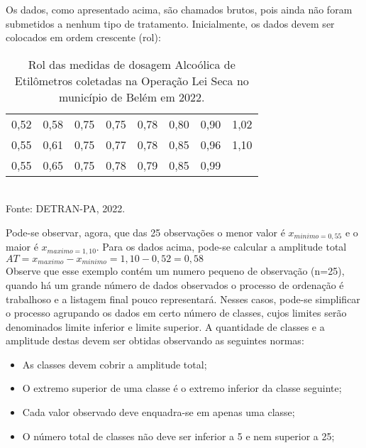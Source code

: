 Os dados, como apresentado acima, são chamados brutos, pois ainda não foram submetidos a nenhum tipo de tratamento. Inicialmente, os dados devem ser colocados em ordem crescente (rol):


\begin{table}[!htb]
    \centering
    {
    \caption{Rol das medidas de dosagem Alcoólica de Etilômetros coletadas na Operação Lei Seca no município de Belém em 2022.}
    \label{estatura}
    \vspace{0.2cm}
\begin{tabular}{c|c|c|c|c|c|c|c}
  \hline\hline
  0,52 & 0,58 & 0,75 & 0,75 & 0,78 & 0,80 & 0,90 & 1,02 \\
  0,55 & 0,61 & 0,75 & 0,77 & 0,78 & 0,85 & 0,96 & 1,10  \\
  0,55 & 0,65 & 0,75 & 0,78 & 0,79 & 0,85 & 0,99 &     \\
  \hline\hline
\end{tabular}}
\\
\hspace{-4.5cm}
Fonte: DETRAN-PA, 2022.
\end{table}


\newpage 
Pode-se observar, agora, que das 25 observações o menor valor é $x_{minimo = 0,55}$ e o maior é $x_{maximo= 1,10}$. Para os dados acima, pode-se calcular a amplitude total $AT = x_{maximo}-x_{minimo}=1,10-0,52=0,58$
\\



Observe que esse exemplo contém um numero pequeno de observação (n=25), quando há um grande número de dados observados o processo de ordenação é trabalhoso e a listagem final pouco representará. Nesses casos, pode-se simplificar o processo agrupando os dados em certo número de classes, cujos limites serão denominados limite inferior e limite superior. A quantidade de classes e a amplitude destas devem ser obtidas observando as seguintes normas:



\begin{itemize}
  \item As classes devem cobrir a amplitude total;
  \item O extremo superior de uma classe é o extremo inferior da classe seguinte;
  \item Cada valor observado deve enquadra-se em apenas uma classe;
  \item O número total de classes não deve ser inferior a 5 e nem superior a 25;
\end{itemize}


